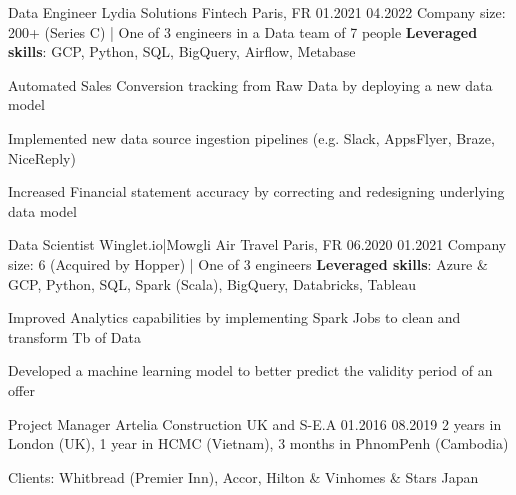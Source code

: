\begin{cventries}
\cventry
{Data Engineer} %
{Lydia Solutions} %
{Fintech} %
{Paris, FR} %
{01.2021} %
{04.2022} %
{Company size: 200+ (Series C) | One of 3 engineers in a Data team of 7 people} %
{\textbf{Leveraged skills}: GCP, Python, SQL, BigQuery, Airflow, Metabase} %
{
  \begin{cvitems} %
    \item {Automated Sales Conversion tracking from Raw Data by deploying a new data model}
    \item {Implemented new data source ingestion pipelines (e.g. Slack, AppsFlyer, Braze, NiceReply)}
    \item {Increased Financial statement accuracy by correcting and redesigning underlying data model}
  \end{cvitems}
}

  \cventry
    {Data Scientist} %
    {Winglet.io|Mowgli} %
    {Air Travel} %
    {Paris, FR} %
    {06.2020} %
    {01.2021} %
    {Company size: 6 (Acquired by Hopper) | One of 3 engineers  } %
    {\textbf{Leveraged skills}: Azure \& GCP, Python, SQL, Spark (Scala), BigQuery, Databricks, Tableau} %
    {
      \begin{cvitems} %
       \item {Improved Analytics capabilities by implementing Spark Jobs to clean and transform Tb of Data}
       \item {Developed a machine learning model to better predict the validity period of an offer}
      \end{cvitems}
    }

  \cventry
    {Project Manager} %
    {Artelia} %
    {Construction}%
    {UK and S-E.A} %
    {01.2016} %
    {08.2019} %
    {2 years in London (UK), 1 year in HCMC (Vietnam), 3 months in PhnomPenh (Cambodia) } %
    {} %
    {
      \begin{cvitems} %
        \item {Clients: Whitbread (Premier Inn), Accor, Hilton \& Vinhomes \& Stars Japan} 
      \end{cvitems}
    }

\end{cventries}
